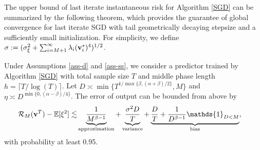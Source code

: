 The upper bound of last iterate instantaneous risk for Algorithm \ref{SGD} can be summarized by the following theorem, which provides the guarantee of global convergence for last iterate SGD with tail geometrically decaying stepsize and a sufficiently small initialization. For simplicity, we define 
$\sigma:=(\sigma_{\xi}^2+\sum_{i=M+1}^{\infty}\lambda_i(\mathbf{v}_i^*)^4)^{1/2}$.
\begin{theorem}\label{theorem-3}
    Under Assumptions \ref{ass-d} and \ref{ass-ss}, we consider a predictor trained by Algorithm \ref{SGD} with total sample size $T$ and middle phase length $h=\lceil T/\log(T)\rceil$. 
    Let $D\asymp\min\{T^{1/\max\{\beta,(\alpha+\beta)/2\}},M\}$ 
    and $\eta\asymp D^{\min\{0,(\alpha-\beta)/4\}}$. The error of output can be bounded from above by
    \begin{equation}\label{risk-main}
        \begin{split}
        \mathcal{R}_M(\upv^T)-\bbE[\xi^2]\lesssim&\underbrace{\frac{1}{M^{\beta-1}}}_{\mathrm{approximation}}+\underbrace{\frac{\sigma^2D}{T}}_{\mathrm{variance}}+\underbrace{\frac{D}{T}+\frac{1}{D^{\beta-1}}\mathds{1}_{D<M}}_{\mathrm{bias}},
        \end{split}
    \end{equation}
    with probability at least 0.95.

\end{theorem}
